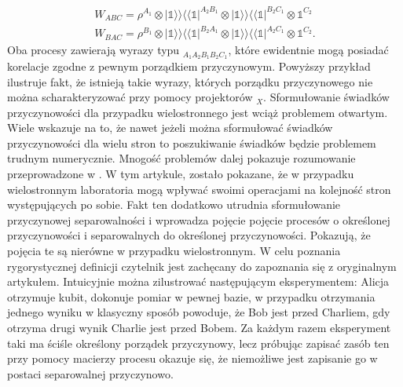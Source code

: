 \documentclass[10pt]{article} %
\newcommand{\BBra}[1]{\langle\langle#1|}
\newcommand{\KKet}[1]{|#1\rangle\rangle}
\newcommand{\I}{\mathbb{1}}
\begin{document}
\begin{gather}
W_{ABC} = \rho^{A_1} \otimes \KKet{\I}\BBra{\I}^{A_2B_1}\otimes \KKet{\I}\BBra{\I}^{B_2C_1} \otimes \I^{C_2} \\
W_{BAC} = \rho^{B_1} \otimes \KKet{\I}\BBra{\I}^{B_2A_1} \otimes \KKet{\I}\BBra{\I}^{A_2C_1} \otimes \I^{C_2}.
\end{gather} Oba procesy zawierają wyrazy typu ${}_{A_1A_2B_1B_2C_1}$, które ewidentnie mogą posiadać korelacje zgodne z pewnym porządkiem przyczynowym. Powyższy przykład ilustruje fakt, że istnieją takie wyrazy, których porządku przyczynowego nie można scharakteryzować przy pomocy projektorów ${}_X$. Sformułowanie świadków przyczynowości dla przypadku wielostronnego jest wciąż problemem otwartym. Wiele wskazuje na to, że nawet jeżeli można sformułować świadków przyczynowości dla wielu stron to poszukiwanie świadków będzie problemem trudnym numerycznie. Mnogość problemów dalej pokazuje rozumowanie przeprowadzone w \cite{mp_cs}. W tym artykule, zostało pokazane, że w przypadku wielostronnym laboratoria mogą wpływać swoimi operacjami na kolejność stron występujących po sobie. Fakt ten dodatkowo utrudnia sformułowanie przyczynowej separowalności i wprowadza pojęcie pojęcie procesów o określonej przyczynowości i separowalnych do określonej przyczynowości. Pokazują, że pojęcia te są nierówne w przypadku wielostronnym. W celu poznania rygorystycznej definicji czytelnik jest zachęcany do zapoznania się z oryginalnym artykułem. Intuicyjnie można zilustrować następującym eksperymentem: Alicja otrzymuje kubit, dokonuje pomiar w pewnej bazie, w przypadku otrzymania jednego wyniku w klasyczny sposób powoduje, że Bob jest przed Charliem, gdy otrzyma drugi wynik Charlie jest przed Bobem. Za każdym razem eksperyment taki ma ściśle określony porządek przyczynowy, lecz próbując zapisać zasób ten przy pomocy macierzy procesu okazuje się, że niemożliwe jest zapisanie go w postaci  separowalnej przyczynowo. 
 
\end{document}
